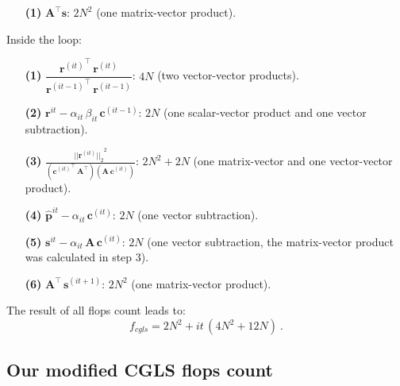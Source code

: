 \begin{itemize}

\item[\textbf{(1)}] $\mathbf{A}^{\top} \mathbf{s}$: $2 N^2$ (one matrix-vector product).
\end{itemize}

Inside the loop:

\begin{itemize}
\item[\textbf{(1)}] $\dfrac{{\mathbf{r}^{(it)}}^{\top} \, \mathbf{r}^{(it)}} {{\mathbf{r}^{(it - 1)}}^{\top} \, \mathbf{r}^{(it - 1)}}$: $4 N$ (two vector-vector products).

\item[\textbf{(2)}] $\mathbf{r}^{it} - \alpha_{it} \,\beta_{it} \, \mathbf{c}^{(it - 1)}$: $2 N$ (one scalar-vector product and one vector subtraction).

\item[\textbf{(3)}] $\frac{{||\mathbf{r}^{(it)}||_2}^2}{({\mathbf{c}^{(it)}}^{\top} \, \mathbf{A}^{\top})(\mathbf{A} \, \mathbf{c}^{(it)})}$: $2 N^2 + 2N$ (one matrix-vector and one vector-vector product).

\item[\textbf{(4)}] $\hat{\mathbf{p}}^{it} - \alpha_{it} \, \mathbf{c}^{(it)}$: $2 N$ (one vector subtraction).

\item[\textbf{(5)}] $\mathbf{s}^{it} - \alpha_{it} \, \mathbf{A} \, \mathbf{c}^{(it)}$: $2 N$ (one vector subtraction, the matrix-vector product was calculated in step 3).

\item[\textbf{(6)}] $ \mathbf{A}^{\top} \, \mathbf{s}^{(it + 1)}$: $2 N^2$ (one matrix-vector product).
\end{itemize}
The result of all flops count leads to:
\begin{equation}
f_{cgls} =  2 N^{2} + it \, (4 N^{2} + 12 N) \: .
\label{eq:flops-cgls-append}
\end{equation}

\subsection{Our modified CGLS flops count}

